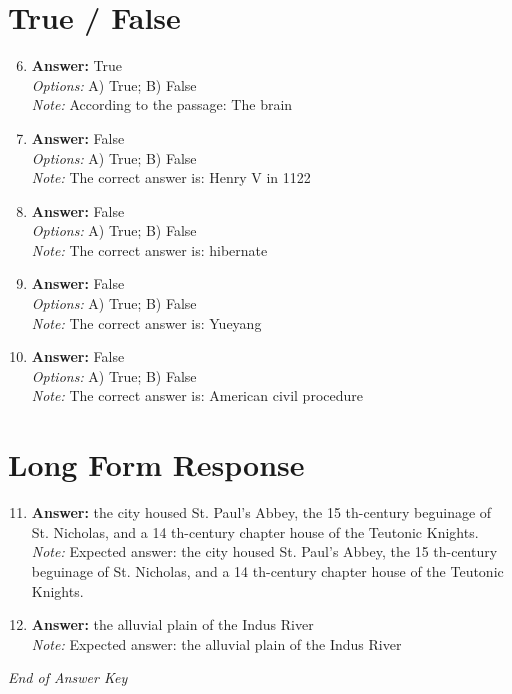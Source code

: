\documentclass[12pt]{article}
\begin{document}
\section*{True / False}
\begin{enumerate}[label=\arabic*.]
\setcounter{enumi}{5}
\item \textbf{Answer:} True
\\ \textit{Options:} A) True; B) False
\\ \textit{Note:} According to the passage: The brain
\item \textbf{Answer:} False
\\ \textit{Options:} A) True; B) False
\\ \textit{Note:} The correct answer is: Henry V in 1122
\item \textbf{Answer:} False
\\ \textit{Options:} A) True; B) False
\\ \textit{Note:} The correct answer is: hibernate
\item \textbf{Answer:} False
\\ \textit{Options:} A) True; B) False
\\ \textit{Note:} The correct answer is: Yueyang
\item \textbf{Answer:} False
\\ \textit{Options:} A) True; B) False
\\ \textit{Note:} The correct answer is: American civil procedure
\end{enumerate}

\section*{Long Form Response}
\begin{enumerate}[label=\arabic*.]
\setcounter{enumi}{10}
\item \textbf{Answer:} the city housed St. Paul's Abbey, the 15 th-century beguinage of St. Nicholas, and a 14 th-century chapter house of the Teutonic Knights.
\\ \textit{Note:} Expected answer: the city housed St. Paul's Abbey, the 15 th-century beguinage of St. Nicholas, and a 14 th-century chapter house of the Teutonic Knights.
\item \textbf{Answer:} the alluvial plain of the Indus River
\\ \textit{Note:} Expected answer: the alluvial plain of the Indus River
\end{enumerate}

\vfill
\noindent\textit{End of Answer Key}
\end{document}
